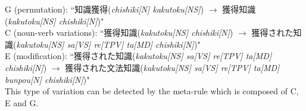 \vspace*{5mm}

\noindent
G (permutation): ``知識獲得({\it chishiki[N] kakutoku[NS]}) $\rightarrow$ 獲得知識({\it kakutoku[NS] chishiki[N]})"\\
C (noun-verb variations): ``獲得知識({\it kakutoku[NS] chishiki[N]}) $\rightarrow$ 獲得された知識({\it kakutoku[NS] sa[VS] re[TPV] ta[MD] chishiki[N]})"\\
E (modification): ``獲得された知識({\it kakutoku[NS] sa[VS] re[TPV] ta[MD] chishiki[N]}) $\rightarrow$ 獲得された文法知識({\it kakutoku[NS] sa[VS] re[TPV] ta[MD] bunpou[N] chishiki[N]})"\\

\noindent
This type of variation can be detected by the meta-rule which is composed of C, E and G.

